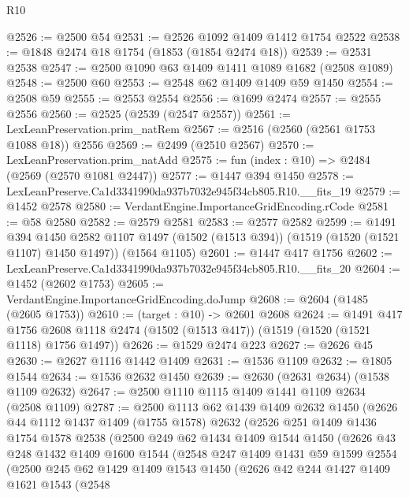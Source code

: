 \begin{lexlean}{R10}
\begin{coremodule}
@2526 := @2500 @54
@2531 := @2526 @1092 @1409 @1412 @1754 @2522
@2538 := @1848 @2474 @18 @1754 (@1853 (@1854 @2474 @18))
@2539 := @2531 @2538
@2547 := @2500 @1090 @63 @1409 @1411 @1089 @1682 (@2508 @1089)
@2548 := @2500 @60
@2553 := @2548 @62 @1409 @1409 @59 @1450
@2554 := @2508 @59
@2555 := @2553 @2554
@2556 := @1699 @2474
@2557 := @2555 @2556
@2560 := @2525 (@2539 (@2547 @2557))
@2561 := LexLeanPreservation.prim_natRem
@2567 := @2516 (@2560 (@2561 @1753 @1088 @18)) @2556
@2569 := @2499 (@2510 @2567)
@2570 := LexLeanPreservation.prim_natAdd
@2575 := fun (index : @10) => @2484 (@2569 (@2570 @1081 @2447))
@2577 := @1447 @394 @1450
@2578 := LexLeanPreserve.Ca1d3341990da937b7032e945f34cb805.R10.__fits_19
@2579 := @1452 @2578
@2580 := VerdantEngine.ImportanceGridEncoding.rCode
@2581 := @58 @2580
@2582 := @2579 @2581
@2583 := @2577 @2582
@2599 := @1491
    @394
    @1450
    @2582
    @1107
    @1497
    (@1502 (@1513 @394))
    (@1519 (@1520 (@1521 @1107) @1450 @1497))
    (@1564 @1105)
@2601 := @1447 @417 @1756
@2602 := LexLeanPreserve.Ca1d3341990da937b7032e945f34cb805.R10.__fits_20
@2604 := @1452 (@2602 @1753)
@2605 := VerdantEngine.ImportanceGridEncoding.doJump
@2608 := @2604 (@1485 (@2605 @1753))
@2610 := (target : @10) -> @2601 @2608
@2624 := @1491
    @417
    @1756
    @2608
    @1118
    @2474
    (@1502 (@1513 @417))
    (@1519 (@1520 (@1521 @1118) @1756 @1497))
@2626 := @1529 @2474 @223
@2627 := @2626 @45
@2630 := @2627 @1116 @1442 @1409
@2631 := @1536 @1109
@2632 := @1805 @1544
@2634 := @1536 @2632 @1450
@2639 := @2630 (@2631 @2634) (@1538 @1109 @2632)
@2647 := @2500 @1110 @1115 @1409 @1441 @1109 @2634 (@2508 @1109)
@2787 := @2500
    @1113
    @62
    @1439
    @1409
    @2632
    @1450
    (@2626
      @44
      @1112
      @1437
      @1409
      (@1755 @1578)
      @2632
      (@2526
        @251
        @1409
        @1436
        @1754
        @1578
        @2538
        (@2500
          @249
          @62
          @1434
          @1409
          @1544
          @1450
          (@2626
            @43
            @248
            @1432
            @1409
            @1600
            @1544
            (@2548
              @247
              @1409
              @1431
              @59
              @1599
              @2554
              (@2500
                @245
                @62
                @1429
                @1409
                @1543
                @1450
                (@2626
                  @42
                  @244
                  @1427
                  @1409
                  @1621
                  @1543
                  (@2548

\end{coremodule}
\end{lexlean}
